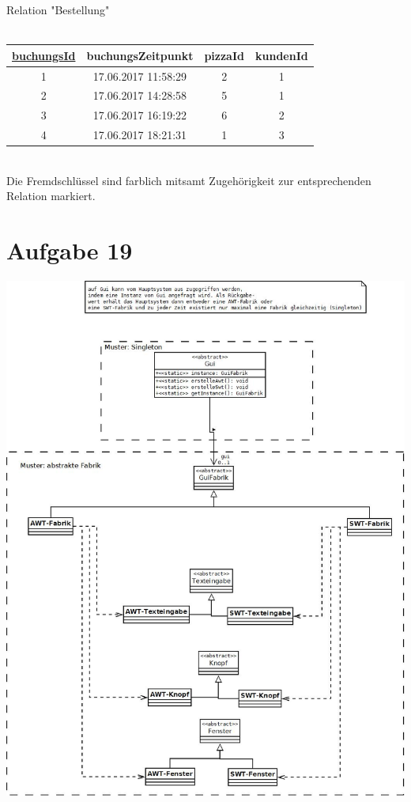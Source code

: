 Relation "Bestellung"\\ \\
\begin{tabular} {|c|c|c|c|}
	\rowcolor{Gray}\hline
	\underline{buchungsId}&buchungsZeitpunkt \phantom{a}&\cellcolor{blue!25}pizzaId&\cellcolor{red!25}kundenId\\\hline
	1&17.06.2017 11:58:29&2&1\\\hline
	2&17.06.2017 14:28:58&5&1\\\hline
	3&17.06.2017 16:19:22&6&2\\\hline
	4&17.06.2017 18:21:31&1&3\\\hline
\end{tabular}\\

Die Fremdschlüssel sind farblich mitsamt Zugehörigkeit zur entsprechenden Relation markiert.
\pagebreak

\pagebreak

\pagebreak

\pagebreak
\section*{Aufgabe 19}
\includegraphics*[width = \textwidth, height = \textheight, keepaspectratio]{19a.jpeg}
\pagebreak

